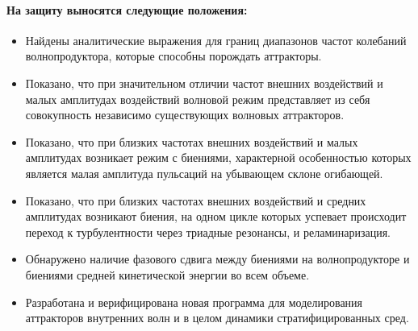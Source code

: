 \paragraph{На защиту выносятся следующие положения:}
\begin{itemize}

  \item Найдены аналитические выражения для границ диапазонов частот колебаний волнопродуктора, которые способны порождать аттракторы.

  \item Показано, что при значительном отличии частот внешних воздействий и малых амплитудах воздействий волновой режим представляет из себя совокупность независимо существующих волновых аттракторов.

  \item Показано, что при близких частотах внешних воздействий и малых амплитудах возникает режим с биениями, характерной особенностью которых является малая амплитуда пульсаций на убывающем склоне огибающей.

  \item Показано, что при близких частотах внешних воздействий и средних амплитудах возникают биения, на одном цикле которых успевает происходит переход к турбулентности через триадные резонансы, и реламинаризация.
    
  \item Обнаружено наличие фазового сдвига между биениями на волнопродукторе и биениями средней кинетической энергии во всем объеме.
    

  \item Разработана и верифицирована новая программа для моделирования аттракторов внутренних волн и в целом динамики стратифицированных сред.
    

    
    
    
\end{itemize}

